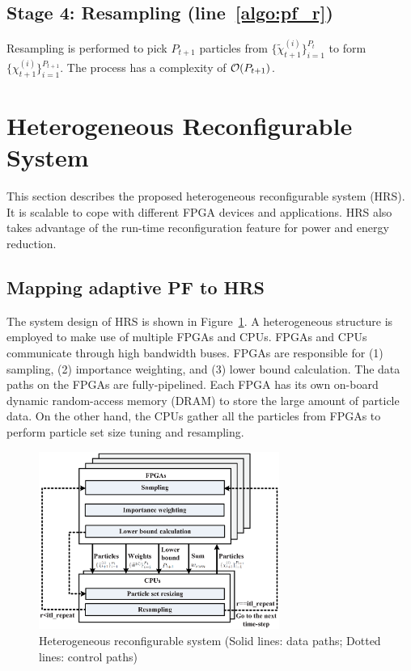 \subsection{Stage 4: Resampling (line~\ref{algo:pf_r})}
Resampling is performed to pick $P_{t+1}$ particles from $\{\widetilde{\chi}_{t+1}^{(i)}\}^{P_t}_{i=1}$ to form $\{\chi_{t+1}^{(i)}\}^{P_{t+1}}_{i=1}$.
The process has a complexity of $\mathop{}\mathopen{}\mathcal{O}\mathopen{}\left(P_{t+1}\right)$.

\section{Heterogeneous Reconfigurable System}
\label{sec:hrs}

This section describes the proposed heterogeneous reconfigurable system (HRS).
It is scalable to cope with different FPGA devices and applications.
HRS also takes advantage of the run-time reconfiguration feature for power and energy reduction.

\subsection{Mapping adaptive PF to HRS}
\label{sec:arch}

The system design of HRS is shown in Figure~\ref{fig:arch}.
A heterogeneous structure is employed to make use of multiple FPGAs and CPUs.
FPGAs and CPUs communicate through high bandwidth buses.
FPGAs are responsible for (1) sampling, (2) importance weighting, and (3) lower bound calculation.
The data paths on the FPGAs are fully-pipelined.
Each FPGA has its own on-board dynamic random-access memory (DRAM) to store the large amount of particle data.
On the other hand, the CPUs gather all the particles from FPGAs to perform particle set size tuning and resampling.

\begin{figure}[t!]
\centering
\includegraphics[width=0.7\textwidth]{runtime_reconfiguration/figures/fig_arch}
\caption{Heterogeneous reconfigurable system (Solid lines: data paths; Dotted lines: control paths)}
\label{fig:arch}
\end{figure}


